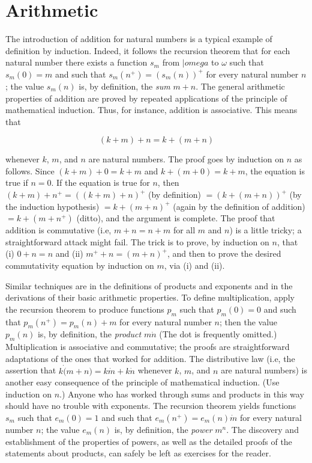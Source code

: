 
\chapter{Arithmetic} 

The introduction of addition for natural numbers is a typical example of definition by induction. Indeed, it follows the recursion theorem that for each natural number there exists a function $s_{m}$ from $|omega$ to $\omega$ such that $s_{m}(0) = m$ and such that $s_{m}(n^{+}) = (s_{m}(n))^{+}$ for every natural number $n$; the value $s_{m}(n)$ is, by definition, the \textit{sum} $m + n$. The general arithmetic properties of addition are proved by repeated applications of the principle of mathematical induction. Thus, for instance, addition is associative. This means that 

\begin{equation*}
(k + m) + n = k + (m + n) 
\end{equation*}

whenever $k$, $m$, and $n$ are natural numbers. The proof goes by induction on $n$ as follows. Since $(k + m) + 0 = k + m$ and $k + (m + 0) = k + m$, the equation is true if $n = 0$. If the equation is true for $n$, then $(k + m) + n^{+} = ((k+ m) + n)^{+}$ (by definition) $ = (k + (m + n))^{+}$ (by the induction hypothesis) $ = k + (m + n)^{+}$ (again by the definition of addition) $ = k + (m + n^{+})$ (ditto), and the argument is complete. The proof that addition is commutative (i.e, $m + n = n+ m$ for all $m$ and $n$) is a little tricky; a straightforward attack might fail. The trick is to prove, by induction on $n$, that (i) $0 + n = n$ and (ii) $m^{+} + n =  (m + n)^{+}$, and then to prove the desired commutativity equation by induction on $m$, via (i) and (ii). 

Similar techniques are in the definitions of products and exponents and in the derivations of their basic arithmetic properties. To define multiplication, apply the recursion theorem to produce functions $p_{m}$ such that $p_{m}(0) = 0$ and such that $p_{m}(n^{+}) = p_{m}(n) + m$ for every natural number $n$; then the value $p_{m}(n)$ is, by definition, the \textit{product} $m \dot n$ (The dot is frequently omitted.) Multiplication is associative and commutative; the proofs are straightforward adaptations of the ones that worked for addition. The distributive law (i.e, the assertion that $k \dot (m + n)  = k \dot m + k \dot n$ whenever $k$, $m$, and $n$ are natural numbers) is another easy consequence of the principle of mathematical induction. (Use induction on $n$.) Anyone who has worked through sums and products in this way should have no trouble with exponents. The recursion theorem yields functions $s_{m}$ such that $e_{m}(0) = 1$ and such that $e_{m}(n^{+}) = e_{m}(n) \dot m$ for every natural number $n$; the value $e_{m}(n)$ is, by definition, the \textit{power} $m^{n}$. The discovery and establishment of the properties of powers, as well as the detailed proofs of the statements about products, can safely be left as exercises for the reader.


